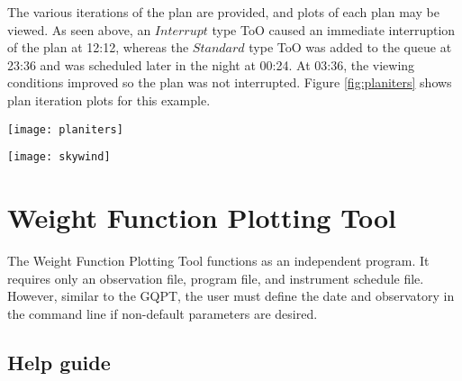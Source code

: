 \documentclass{article}
\begin{document}
The various iterations of the plan are provided, and plots of each plan may be viewed.  As seen above, an $Interrupt$ type ToO caused an immediate interruption of the plan at 12:12, whereas the $Standard$ type ToO was added to the queue at 23:36 and was scheduled later in the night at 00:24.  At 03:36, the viewing conditions improved so the plan was not interrupted.  Figure \ref{fig:planiters} shows plan iteration plots for this example.

{\centering
 \texttt{[image: planiters]}\\
 \label{fig:planiters}
}
\vspace{4mm}

{\centering
 \texttt{[image: skywind]}\\
 \label{fig:skywind}
}
\vspace{4mm}

\section{Weight Function Plotting Tool}
\label{sec:wfpt}

The Weight Function Plotting Tool functions as an independent program.  It requires only an observation file, program file, and instrument schedule file.  However, similar to the GQPT, the user must define the date and observatory in the command line if non-default parameters are desired. 

\subsection{Help guide}
\end{document}
